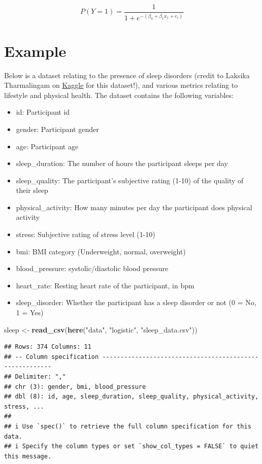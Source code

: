 \documentclass[
]{book}
\newenvironment{Shaded}{\begin{snugshade}}{\end{snugshade}}
\newcommand{\FunctionTok}[1]{\textcolor[rgb]{0.13,0.29,0.53}{\textbf{#1}}}
\newcommand{\NormalTok}[1]{#1}
\newcommand{\OtherTok}[1]{\textcolor[rgb]{0.56,0.35,0.01}{#1}}
\newcommand{\StringTok}[1]{\textcolor[rgb]{0.31,0.60,0.02}{#1}}
\providecommand{\tightlist}{%
  \setlength{\itemsep}{0pt}\setlength{\parskip}{0pt}}
\begin{document}
\[
P(Y = 1) = \frac{1}{1 + e^{-(\beta_0 + \beta_1 x_1 + \epsilon_i)}} 
\]

\hypertarget{example-8}{%
\section{Example}\label{example-8}}

Below is a dataset relating to the presence of sleep disorders (credit to Laksika Tharmalingam on \href{https://www.kaggle.com/datasets/uom190346a/sleep-health-and-lifestyle-dataset}{Kaggle} for this dataset!), and various metrics relating to lifestyle and physical health. The dataset contains the following variables:

\begin{itemize}
\tightlist
\item
  id: Participant id
\item
  gender: Participant gender
\item
  age: Participant age
\item
  sleep\_duration: The number of hours the participant sleeps per day
\item
  sleep\_quality: The participant's subjective rating (1-10) of the quality of their sleep
\item
  physical\_activity: How many minutes per day the participant does physical activity
\item
  stress: Subjective rating of stress level (1-10)
\item
  bmi: BMI category (Underweight, normal, overweight)
\item
  blood\_pressure: systolic/diastolic blood pressure
\item
  heart\_rate: Resting heart rate of the participant, in bpm
\item
  sleep\_disorder: Whether the participant has a sleep disorder or not (0 = No, 1 = Yes)
\end{itemize}

\begin{Shaded}
\begin{Highlighting}[]
\NormalTok{sleep }\OtherTok{\textless{}{-}} \FunctionTok{read\_csv}\NormalTok{(}\FunctionTok{here}\NormalTok{(}\StringTok{"data"}\NormalTok{, }\StringTok{"logistic"}\NormalTok{, }\StringTok{"sleep\_data.csv"}\NormalTok{))}
\end{Highlighting}
\end{Shaded}

\begin{verbatim}
## Rows: 374 Columns: 11
## -- Column specification --------------------------------------------------------
## Delimiter: ","
## chr (3): gender, bmi, blood_pressure
## dbl (8): id, age, sleep_duration, sleep_quality, physical_activity, stress, ...
## 
## i Use `spec()` to retrieve the full column specification for this data.
## i Specify the column types or set `show_col_types = FALSE` to quiet this message.
\end{verbatim}
\end{document}
